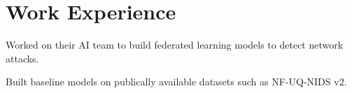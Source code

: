 \documentclass[]{resume-template}
\begin{document}
\begin{minipage}[t]{0.66\textwidth}

	\section{Work Experience}\label{sec:Work Experience}
	\label{subsec:protectionshield}
	\vspace{\topsep}
	\begin{tightemize}
		\item Worked on their AI team to build federated learning models to detect network attacks.
		\item Built baseline models on publically available datasets such as NF-UQ-NIDS v2.
	\end{tightemize}


\end{minipage}
\end{document}
